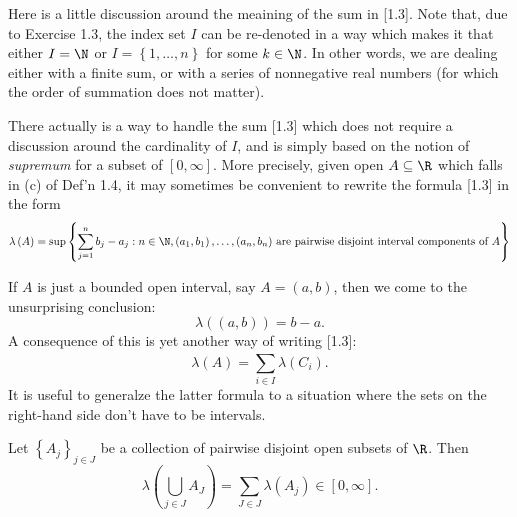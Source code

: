 \documentclass[pmath450]{subfiles}
\begin{document}
    \np Here is a little discussion around the meaining of the sum in [1.3]. Note that, due to Exercise 1.3, the index set $I$ can be re-denoted in a way which makes it that either $I=\N$ or $I=\left\lbrace 1,\ldots,n \right\rbrace$ for some $k\in\N$. In other words, we are dealing either with a finite sum, or with a series of nonnegative real numbers (for which the order of summation does not matter).

    There actually is a way to handle the sum [1.3] which does not require a discussion around the cardinality of $I$, and is simply based on the notion of \textit{supremum} for a subset of $\left[ 0,\infty \right]$. More precisely, given open $A\subseteq\R$ which falls in (c) of Def'n 1.4, it may sometimes be convenient to rewrite the formula [1.3] in the form
    \begin{equation}
        \lambda\left( A \right)=\sup\left\lbrace \sum^{n}_{j=1}b_j-a_j: n\in\N, \text{$\left( a_1,b_1 \right),\ldots,\left( a_n,b_n \right)$ are pairwise disjoint interval components of $A$} \right\rbrace
    \end{equation}

    \np If $A$ is just a bounded open interval, say $A=\left( a,b \right)$, then we come to the unsurprising conclusion:
    \begin{equation*}
        \lambda\left( \left( a,b \right) \right)=b-a.
    \end{equation*}
    A consequence of this is yet another way of writing [1.3]:
    \begin{equation}
        \lambda\left( A \right) = \sum^{}_{i\in I}\lambda\left( C_i \right).
    \end{equation}
    It is useful to generalze the latter formula to a situation where the sets on the right-hand side don't have to be intervals.

    \begin{prop}{}
        Let $\left\lbrace A_j \right\rbrace^{}_{j\in J}$ be a collection of pairwise disjoint open subsets of $\R$. Then
        \begin{equation}
            \lambda\left( \bigcup^{}_{j\in J}A_J \right) = \sum^{}_{J\in J}\lambda\left( A_j \right)\in\left[ 0,\infty \right].
        \end{equation}
    \end{prop}
    
    \placeqed[Tl;dr]
\end{document}
